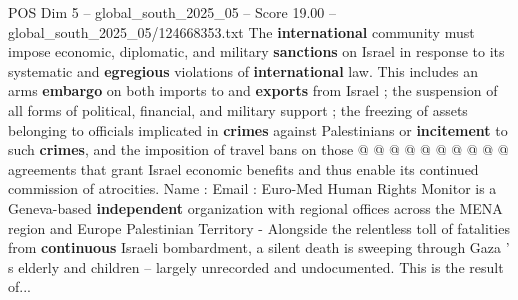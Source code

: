 \begin{textsample}{POS Dim 5 – global\_south\_2025\_05 – Score 19.00 – global\_south\_2025\_05/124668353.txt}
The \textbf{international} community must impose economic, diplomatic, and military \textbf{sanctions} on Israel in response to its systematic and \textbf{egregious} violations of \textbf{international} law.
This includes an arms \textbf{embargo} on both imports to and \textbf{exports} from Israel ; the suspension of all forms of political, financial, and military support ; the freezing of assets belonging to officials implicated in \textbf{crimes} against Palestinians or \textbf{incitement} to such \textbf{crimes}, and the imposition of travel bans on those @ @ @ @ @ @ @ @ @ @ agreements that grant Israel economic benefits and thus enable its continued commission of atrocities.
Name : Email : Euro-Med Human Rights Monitor is a Geneva-based \textbf{independent} organization with regional offices across the MENA region and Europe Palestinian Territory - Alongside the relentless toll of fatalities from \textbf{continuous} Israeli bombardment, a silent death is sweeping through Gaza ' s elderly and children -- largely unrecorded and undocumented.
This is the result of...

\end{textsample}
